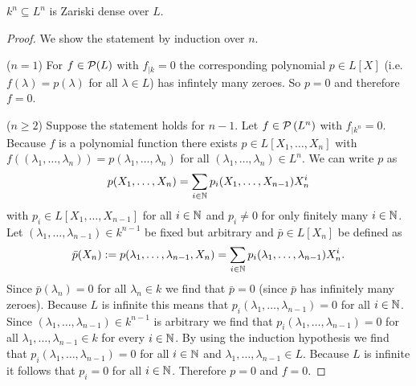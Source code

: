 \begin{lem}
 $k^n \subseteq L^n$ is Zariski dense over $L$.
\end{lem}
\begin{proof}
 We show the statement by induction over $n$.
 
 ($n = 1$) For $f \in \mathcal{P}(L)$ with $f_{|k} = 0$ the corresponding polynomial $p \in L[X]$ (i.e.\ $f(\lambda) = p(\lambda)$ for all $\lambda \in L$) has infintely many zeroes. So $p = 0$ and therefore $f = 0$.
 
 ($n \geq 2$) Suppose the statement holds for $n-1$. Let $f \in \mathcal{P}\left(L^n\right)$ with $f_{|k^n} = 0$. Because $f$ is a polynomial function there exists $p \in L[X_1, \dotsc, X_n]$ with $f((\lambda_1, \dotsc, \lambda_n)) = p(\lambda_1, \dotsc, \lambda_n)$ for all $(\lambda_1, \dotsc, \lambda_n) \in L^n$. We can write $p$ as
 \[
  p(X_1, \dotsc, X_n) = \sum_{i \in \mathbb{N}} p_i(X_1, \dotsc, X_{n-1}) X_n^i
 \]
 with $p_i \in L[X_1, \dotsc, X_{n-1}]$ for all $i \in \mathbb{N}$ and $p_i \neq 0$ for only finitely many $i \in \mathbb{N}$. Let $(\lambda_1, \dotsc, \lambda_{n-1}) \in k^{n-1}$ be fixed but arbitrary and $\bar{p} \in L[X_n]$ be defined as
 \[
  \bar{p}(X_n) := p(\lambda_1, \dotsc, \lambda_{n-1}, X_n) = \sum_{i \in \mathbb{N}} p_i(\lambda_1, \dotsc, \lambda_{n-1}) X_n^i.
 \]
 Since $\bar{p}(\lambda_n) = 0$ for all $\lambda_n \in k$ we find that $\bar{p} = 0$ (since $\bar{p}$ has infinitely many zeroes). Because $L$ is infinite this means that $p_i(\lambda_1, \dotsc, \lambda_{n-1}) = 0$ for all $i \in \mathbb{N}$. Since $(\lambda_1, \dotsc, \lambda_{n-1}) \in k^{n-1}$ is arbitrary we find that $p_i(\lambda_1, \dotsc, \lambda_{n-1}) = 0$ for all $\lambda_1, \dotsc, \lambda_{n-1} \in k$ for every $i \in \mathbb{N}$. By using the induction hypothesis we find that $p_i(\lambda_1, \dotsc, \lambda_{n-1}) = 0$ for all $i \in \mathbb{N}$ and $\lambda_1, \dotsc, \lambda_{n-1} \in L$. Because $L$ is infinite it follows that $p_i = 0$ for all $i \in \mathbb{N}$. Therefore $p = 0$ and $f = 0$.
\end{proof}


